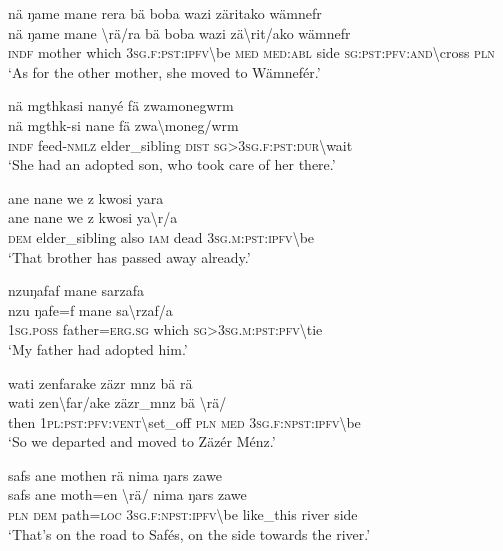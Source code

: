 \ea\label{ex:14:a3070}
nä ŋame mane rera bä boba wazi zäritako wämnefr\\
\gll nä	ŋame	mane	{\textbackslash}rä/ra	bä	boba	wazi	zä{\textbackslash}rit/ako	wämnefr\\
     \textsc{indf}	mother	which	3\textsc{sg}.\textsc{f}:\textsc{pst}:\textsc{ipfv}{\textbackslash}be	\textsc{med}	\textsc{med}:\textsc{abl}	side	\textsc{sg}:\textsc{pst}:\textsc{pfv}:\textsc{and}{\textbackslash}cross	\textsc{pln}\\
\glt `As for the other mother, she moved to Wämnefér.'
\z

\ea\label{ex:14:a3072}
nä mgthkasi nanyé fä zwamonegwrm\\
\gll nä	mgthk-si	nane	fä	zwa{\textbackslash}moneg/wrm\\
     \textsc{indf}	feed-\textsc{nmlz}	elder\_sibling	\textsc{dist}	\textsc{sg}>3\textsc{sg}.\textsc{f}:\textsc{pst}:\textsc{dur}{\textbackslash}wait\\
\glt `She had an adopted son, who took care of her there.'
\z

\ea\label{ex:14:a3074}
ane nane we z kwosi yara\\
\gll ane	nane	we	z	kwosi	ya{\textbackslash}r/a\\
     \textsc{dem}	elder\_sibling	also	\textsc{iam}	dead	3\textsc{sg}.\textsc{m}:\textsc{pst}:\textsc{ipfv}{\textbackslash}be\\
\glt `That brother has passed away already.'
\z

\ea\label{ex:14:a3075}
nzuŋafaf mane sarzafa\\
\gll nzu	ŋafe=f	mane	sa{\textbackslash}rzaf/a\\
     1\textsc{sg}.\textsc{poss}	father=\textsc{erg}.\textsc{sg}	which	\textsc{sg}>3\textsc{sg}.\textsc{m}:\textsc{pst}:\textsc{pfv}{\textbackslash}tie\\
\glt `My father had adopted him.'
\z

\ea\label{ex:14:a3076}
wati zenfarake zäzr mnz bä rä\\
\gll wati	zen{\textbackslash}far/ake	zäzr\_mnz	bä	{\textbackslash}rä/\\
     then	1\textsc{pl}:\textsc{pst}:\textsc{pfv}:\textsc{vent}{\textbackslash}set\_off	\textsc{pln}	\textsc{med}	3\textsc{sg}.\textsc{f}:\textsc{npst}:\textsc{ipfv}{\textbackslash}be\\
\glt `So we departed and moved to Zäzér Ménz.'
\z

\ea\label{ex:14:a3078}
safs ane mothen rä nima ŋars zawe\\
\gll safs	ane	moth=en	{\textbackslash}rä/	nima	ŋars	zawe\\
     \textsc{pln}	\textsc{dem}	path=\textsc{loc}	3\textsc{sg}.\textsc{f}:\textsc{npst}:\textsc{ipfv}{\textbackslash}be	like\_this	river	side\\
\glt `That's on the road to Safés, on the side towards the river.'
\z

